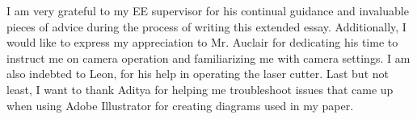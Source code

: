 \documentclass[12pt, oneside]{article}
\begin{document}
I am very grateful to my EE supervisor for his continual guidance and invaluable pieces of advice during the process of writing this extended essay. Additionally, I would like to express my appreciation to Mr. Auclair for dedicating his time to instruct me on camera operation and familiarizing me with camera settings. I am also indebted to Leon, for his help in operating the laser cutter. Last but not least, I want to thank Aditya for helping me troubleshoot issues that came up when using Adobe Illustrator for creating diagrams used in my paper.
\clearpage
\pagestyle{backmatter}

\printbibliography[heading=bibintoc]{}


\clearpage
\begin{appendices}
    \pagestyle{appendices}
    
    
    
\end{appendices}
\end{document}
